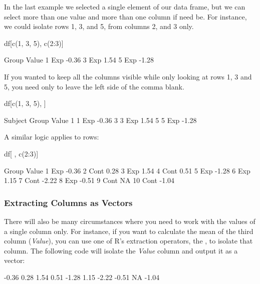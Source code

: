In the last example we selected a single element of our data frame, but we can select more than one value and more than one column if need be.  For instance, we could isolate rows 1, 3, and 5, from columns 2, and 3 only.

\begin{inR}
df[c(1, 3, 5), c(2:3)]
\end{inR}
\begin{outR}
  Group Value
1   Exp -0.36
3   Exp  1.54
5   Exp -1.28
\end{outR}

\noindent
If you wanted to keep all the columns visible while only looking at rows 1, 3 and 5, you need only to leave the left side of the comma blank.

\begin{inR}
df[c(1, 3, 5), ]
\end{inR}
\begin{outR}
  Subject Group Value
1       1   Exp -0.36
3       3   Exp  1.54
5       5   Exp -1.28
\end{outR}

\noindent
A similar logic applies to rows:

\begin{inR}
df[ , c(2:3)]
\end{inR}
\begin{outR}
   Group Value
1    Exp -0.36
2   Cont  0.28
3    Exp  1.54
4   Cont  0.51
5    Exp -1.28
6    Exp  1.15
7   Cont -2.22
8    Exp -0.51
9   Cont    NA
10  Cont -1.04
\end{outR}

\subsubsection{Extracting Columns as Vectors}

There will also be many circumstances where you need to work with the values of a single column only.  For instance, if you want to calculate the mean of the third column (\textit{Value}), you can use one of R's extraction operators, the \R{\$}, to isolate that column. The following code will isolate the \textit{Value} column and output it as a vector:

\begin{outR}
[1] -0.36  0.28  1.54  0.51 -1.28  1.15 -2.22 -0.51  NA -1.04
\end{outR}

